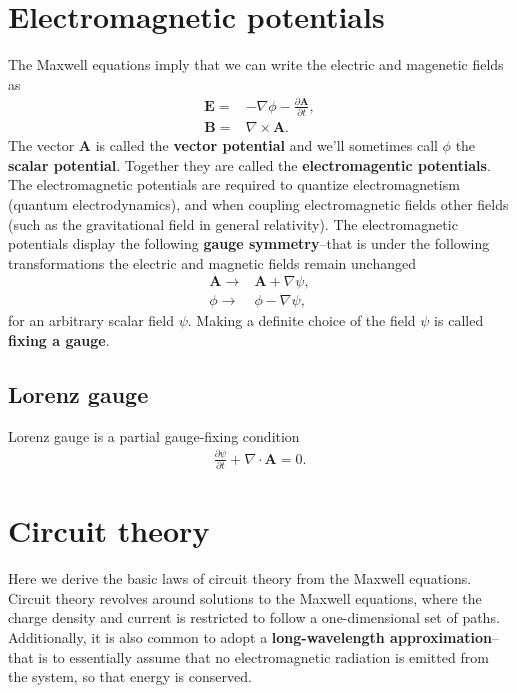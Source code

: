 \documentclass[12pt]{report}
\newcommand{\bA}{{\bm A}}
\newcommand{\bB}{{\bm B}}
\newcommand{\bE}{{\bm E}}
\begin{document}
\chapter{Electromagnetic potentials}

The Maxwell equations imply that we can write the electric and magenetic fields as
\begin{align}
    \bE
    =&
    -
    \nabla\phi
    -
    \frac{\partial\bA}{\partial t}
    ,\\
    \bB
    =&
    \nabla\times\bA
    .
\end{align}
The vector $\bA$ is called the \textbf{vector potential} and we'll sometimes call $\phi$ the \textbf{scalar potential}. 
Together they are called the \textbf{electromagentic potentials}.
The electromagnetic potentials are required to quantize electromagnetism (quantum electrodynamics), and when coupling electromagnetic fields other fields (such as the gravitational field in general relativity).
The electromagnetic potentials display the following \textbf{gauge symmetry}--that is under the following transformations the electric and magnetic fields remain unchanged
\begin{align}
    \bA
    \to&
    \bA
    +
    \nabla\psi
    ,\\
    \phi
    \to&
    \phi
    -
    \nabla\psi
    ,
\end{align}
for an arbitrary scalar field $\psi$.
Making a definite choice of the field $\psi$ is called \textbf{fixing a gauge}.

\section{Lorenz gauge}
Lorenz gauge is a partial gauge-fixing condition
\begin{align}
    \frac{\partial\psi}{\partial t} + \nabla \cdot \bA = 0
    .
\end{align}

\chapter{Circuit theory}

Here we derive the basic laws of circuit theory from the Maxwell equations.
Circuit theory revolves around solutions to the Maxwell equations, where the charge density and current is restricted to follow a one-dimensional set of paths.
Additionally, it is also common to adopt a \textbf{long-wavelength approximation}--that is to essentially assume that no electromagnetic radiation is emitted from the system, so that energy is conserved. 
\end{document}
